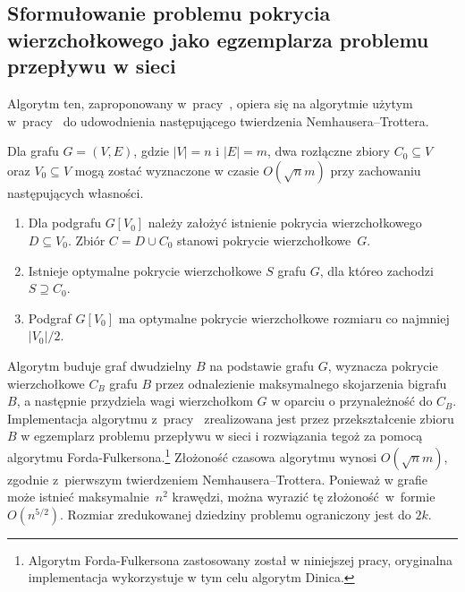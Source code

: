 \subsection{Sformułowanie problemu pokrycia wierzchołkowego jako egzemplarza problemu przepływu w sieci}\label{Kernelization_network_flow}
Algorytm ten, zaproponowany w~pracy~\cite{KernelizationAlgorithms04}, opiera się na
algorytmie użytym w~pracy~\cite{Niedermeier02} do udowodnienia następującego twierdzenia
Nemhausera--Trottera.

\begin{theorem}
  Dla grafu $G=(V,E)$, gdzie $|V|=n$ i $|E|=m$, dwa rozłączne zbiory $C_0 \subseteq V$ oraz $V_0 \subseteq V$ mogą zostać wyznaczone w czasie $O(\sqrt{n}m)$ przy zachowaniu następujących własności.
  \begin{enumerate}
    \item Dla podgrafu $G[V_0]$ należy założyć istnienie pokrycia wierzchołkowego $D \subseteq V_0$.
    Zbiór $C = D \cup C_0$ stanowi pokrycie wierzchołkowe~$G$.
    \item Istnieje optymalne pokrycie wierzchołkowe $S$ grafu $G$, dla któreo zachodzi $S \supseteq C_0$.
    \item Podgraf $G[V_0]$ ma optymalne pokrycie wierzchołkowe rozmiaru co najmniej $|V_0|/2$. 
  \end{enumerate}
\end{theorem}

Algorytm buduje graf dwudzielny $B$ na podstawie grafu $G$, wyznacza pokrycie wierzchołkowe $C_B$ grafu $B$ przez odnalezienie maksymalnego skojarzenia bigrafu $B$,
a następnie przydziela wagi wierzchołkom $G$ w oparciu o przynależność do $C_B$.
Implementacja algorytmu z~pracy~\cite{Niedermeier02} zrealizowana jest przez
przekształcenie zbioru $B$ w egzemplarz problemu przepływu w sieci i rozwiązania tegoż za pomocą algorytmu Forda-Fulkersona.\footnote{Algorytm Forda-Fulkersona
  zastosowany został w niniejszej pracy, oryginalna implementacja wykorzystuje w tym celu algorytm Dinica.}
Złożoność czasowa algorytmu wynosi $O(\sqrt{n}m)$, zgodnie z~pierwszym twierdzeniem Nemhausera--Trottera. 
Ponieważ w grafie może istnieć maksymalnie~$n^2$ krawędzi, można wyrazić tę złożoność~w~formie $O(n^{5/2})$.
Rozmiar zredukowanej dziedziny problemu ograniczony jest do $2k$.

